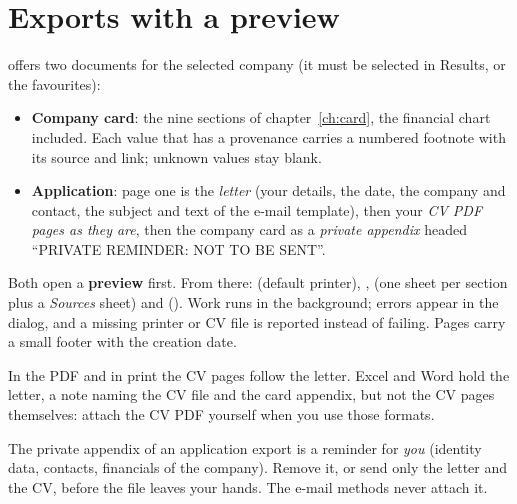 \section{Exports with a preview}
 offers two documents for the selected company (it must be selected
in Results,  or the favourites):
\begin{itemize}
  \item \textbf{Company card}: the nine sections of chapter~\ref{ch:card}, the financial
        chart included. Each value that has a provenance carries a numbered footnote with
        its source and link; unknown values stay blank.
  \item \textbf{Application}: page one is the \emph{letter} (your details, the date, the
        company and contact, the subject and text of the e-mail template), then your
        \emph{CV PDF pages as they are}, then the company card as a \emph{private
        appendix} headed ``PRIVATE REMINDER: NOT TO BE SENT''.
\end{itemize}
Both open a \textbf{preview} first. From there:  (default printer),
,  (one sheet per section plus a \emph{Sources} sheet) and
 (). Work runs in the background; errors appear in the dialog, and a missing
printer or CV file is reported instead of failing. Pages carry a small footer with the
creation date.

\begin{infobox}
In the PDF and in print the CV pages follow the letter. Excel and Word hold the letter,
a note naming the CV file and the card appendix, but not the CV pages themselves: attach
the CV PDF yourself when you use those formats.
\end{infobox}

\begin{warnbox}
The private appendix of an application export is a reminder for \emph{you} (identity
data, contacts, financials of the company). Remove it, or send only the letter and the
CV, before the file leaves your hands. The e-mail methods never attach it.
\end{warnbox}
